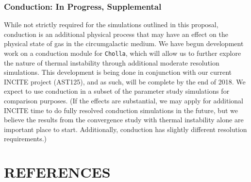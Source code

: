 \documentclass[11pt,letterpaper,english]{article}
\begin{document}
\vspace{-.2in}
\subsubsection{Conduction: In Progress, Supplemental}
\vspace{-.25in}

While not strictly required for the simulations outlined in this proposal, conduction is an additional physical process that may have an effect on the physical state of gas in the circumgalactic medium. We have begun development work on a conduction module for {\tt Cholla}, which will allow us to further explore the nature of thermal instability through additional moderate resolution simulations. This development is being done in conjunction with our current INCITE project (AST125), and as such, will be complete by the end of 2018. We expect to use conduction in a subset of the parameter study simulations for comparison purposes. (If the effects are substantial, we may apply for additional INCITE time to do fully resolved conduction simulations in the future, but we believe the results from the convergence study with thermal instability alone are important place to start. Additionally, conduction has slightly different resolution requirements.)

\vspace{-.3in}
\section{REFERENCES}
\vspace{-.3in}

\end{document}
